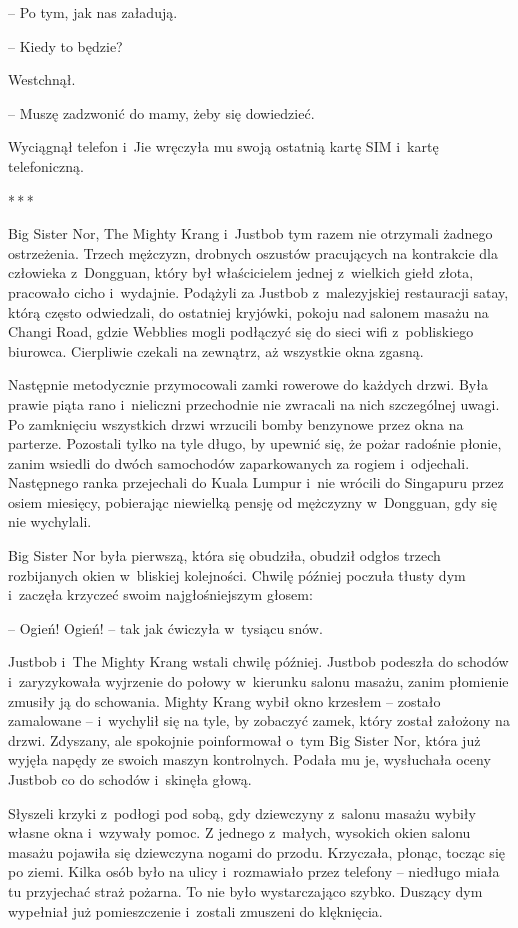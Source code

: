\documentclass[oneside,polish,11pt,rmheadings]{mwbk}
\newcommand{\threeast}{\par\centerline{*\,*\,*}\medskip\par}
\begin{document}
-- Po tym, jak nas załadują.

-- Kiedy to będzie? 

Westchnął. 

-- Muszę zadzwonić do mamy, żeby się dowiedzieć. 

Wyciągnął telefon i~Jie wręczyła mu swoją ostatnią kartę SIM i~kartę telefoniczną.

\bigskip
\threeast

Big Sister Nor, The Mighty Krang i~Justbob tym razem nie otrzymali żadnego ostrzeżenia. Trzech mężczyzn, drobnych oszustów pracujących na kontrakcie dla człowieka z~Dongguan, który był właścicielem jednej z~wielkich giełd złota, pracowało cicho i~wydajnie. Podążyli za Justbob z~malezyjskiej restauracji satay, którą często odwiedzali, do ostatniej kryjówki, pokoju nad salonem masażu na Changi Road, gdzie Webblies mogli podłączyć się do sieci wifi z~pobliskiego biurowca. Cierpliwie czekali na zewnątrz, aż wszystkie okna zgasną.

Następnie metodycznie przymocowali zamki rowerowe do każdych drzwi. Była prawie piąta rano i~nieliczni przechodnie nie zwracali na nich szczególnej uwagi. Po zamknięciu wszystkich drzwi wrzucili bomby benzynowe przez okna na parterze. Pozostali tylko na tyle długo, by upewnić się, że pożar radośnie płonie, zanim wsiedli do dwóch samochodów zaparkowanych za rogiem i~odjechali. Następnego ranka przejechali do Kuala Lumpur i~nie wrócili do Singapuru przez osiem miesięcy, pobierając niewielką pensję od mężczyzny w~Dongguan, gdy się nie wychylali.

Big Sister Nor była pierwszą, która się obudziła, obudził odgłos trzech rozbijanych okien w~bliskiej kolejności. Chwilę później poczuła tłusty dym i~zaczęła krzyczeć swoim najgłośniejszym głosem: 

-- Ogień! Ogień! -- tak jak ćwiczyła w~tysiącu snów.

Justbob i~The Mighty Krang wstali chwilę później. Justbob podeszła do schodów i~zaryzykowała wyjrzenie do połowy w~kierunku salonu masażu, zanim płomienie zmusiły ją do schowania. Mighty Krang wybił okno krzesłem -- zostało zamalowane -- i~wychylił się na tyle, by zobaczyć zamek, który został założony na drzwi. Zdyszany, ale spokojnie poinformował o~tym Big Sister Nor, która już wyjęła napędy ze swoich maszyn kontrolnych. Podała mu je, wysłuchała oceny Justbob co do schodów i~skinęła głową.

Słyszeli krzyki z~podłogi pod sobą, gdy dziewczyny z~salonu masażu wybiły własne okna i~wzywały pomoc. Z jednego z~małych, wysokich okien salonu masażu pojawiła się dziewczyna nogami do przodu. Krzyczała, płonąc, tocząc się po ziemi. Kilka osób było na ulicy i~rozmawiało przez telefony -- niedługo miała tu przyjechać straż pożarna. To nie było wystarczająco szybko. Duszący dym wypełniał już pomieszczenie i~zostali zmuszeni do klęknięcia.
\end{document}
